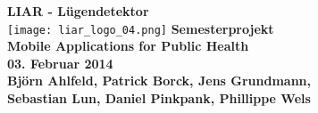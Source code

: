 \begin{titlepage}
    \centering
    \vfill
    {\bfseries\Huge
    		LIAR - Lügendetektor \\
    }    
    \vfill
    \texttt{[image: liar\_logo\_04.png]} %
    \vfill
    {\bfseries\Large 
        Semesterprojekt \\
        Mobile Applications for Public Health\\
        03. Februar 2014\\
        \vskip2cm
        Björn Ahlfeld, Patrick Borck, Jens Grundmann,\\ Sebastian Lun, Daniel Pinkpank, Phillippe Wels\\
	}
    \vfill
    \vfill
\end{titlepage}
